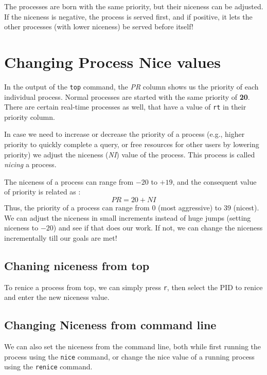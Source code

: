 The processes are born with the same priority, but their niceness can be adjusted. If the niceness is negative, the process is served first, and if positive, it lets the other processes (with lower niceness) be served before itself!

\section{Changing Process Nice values}
In the output of the \verb|top| command, the \textit{PR} column shows us the priority of each individual process. Normal processes are started with the same priority of \textbf{20}. There are certain real-time processes as well, that have a value of \verb|rt| in their priority column.

In case we need to increase or decrease the priority of a process (e.g., higher priority to quickly complete a query, or free resources for other users by lowering priority) we adjust the niceness (\textit{NI}) value of the process. This process is called \textit{nicing} a process. 

The niceness of a process can range from $-20$ to $+19$, and the consequent value of priority is related as : $$PR = 20 + NI$$ Thus, the priority of a process can range from $0$ (most aggressive) to $39$ (nicest). We can adjust the niceness in small increments instead of huge jumps (setting niceness to $-20$) and see if that does our work. If not, we can change the niceness incrementally till our goals are met!

\subsection{Chaning niceness from top}
To renice a process from top, we can simply press \verb|r|, then select the PID to renice and enter the new niceness value.

\subsection{Changing Niceness from command line}
We can also set the niceness from the command line, both while first running the process using the \verb|nice| command, or change the nice value of a running process using the \verb|renice| command. 

